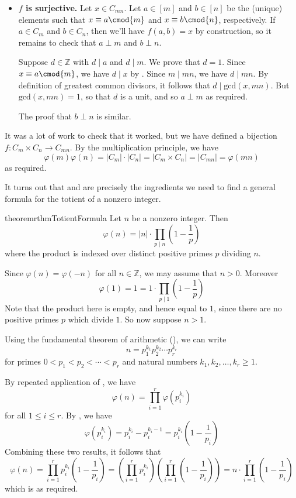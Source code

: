\begin{cproof}
\begin{itemize}
\item \textbf{$f$ is surjective.} Let $x \in C_{mn}$. Let $a \in [m]$ and $b \in [n]$ be the (unique) elements such that $x \equiv a \cmod{m}$ and $x \equiv b \cmod{n}$, respectively. If $a \in C_m$ and $b \in C_n$, then we'll have $f(a,b)=x$ by construction, so it remains to check that $a \perp m$ and $b \perp n$.

Suppose $d \in \mathbb{Z}$ with $d \mid a$ and $d \mid m$. We prove that $d=1$. Since $x \equiv a \cmod{m}$, we have $d \mid x$ by . Since $m \mid mn$, we have $d \mid mn$. By definition of greatest common divisors, it follows that $d \mid \mathrm{gcd}(x,mn)$. But $\mathrm{gcd}(x,mn)=1$, so that $d$ is a unit, and so $a \perp m$ as required.

The proof that $b \perp n$ is similar.
\end{itemize}
It was a lot of work to check that it worked, but we have defined a bijection $f : C_m \times C_n \to C_{mn}$. By the multiplication principle, we have
\[ \varphi(m) \varphi(n) = |C_m| \cdot |C_n| = |C_m \times C_n| = |C_{mn}| = \varphi(mn) \]
as required.
\end{cproof}

It turns out that  and  are precisely the ingredients we need to find a general formula for the totient of a nonzero integer.

\begin{restatable}{theorem}{rthmTotientFormula}
\label{thmTotientFormula}
Let $n$ be a nonzero integer. Then
\[ \varphi(n) = |n| \cdot \prod_{p \mid n} \left( 1 - \frac{1}{p} \right) \]
where the product is indexed over distinct positive primes $p$ dividing $n$.
\end{restatable}
\begin{cproof}
Since $\varphi(n) = \varphi(-n)$ for all $n \in \mathbb{Z}$, we may assume that $n>0$. Moreover
\[ \varphi(1) = 1 = 1 \cdot \prod_{p \mid 1} \left( 1 - \frac{1}{p} \right) \]
Note that the product here is empty, and hence equal to $1$, since there are no positive primes $p$ which divide $1$. So now suppose $n>1$.

Using the fundamental theorem of arithmetic (), we can write
\[ n = p_1^{k_1}p_2^{k_2} \cdots p_r^{k_r} \]
for primes $0<p_1<p_2<\cdots<p_r$ and natural numbers $k_1,k_2,\dots,k_r \ge 1$.

By repeated application of , we have
\[ \varphi(n) = \prod_{i=1}^r \varphi(p_i^{k_i}) \]
for all $1 \le i \le r$. By , we have
\[ \varphi(p_i^{k_i}) = p_i^{k_i}-p_i^{k_i-1} = p_i^{k_i} \left( 1-\frac{1}{p_i} \right) \]
Combining these two results, it follows that
\[ \varphi(n) = \prod_{i=1}^r p_i^{k_i} \left( 1 - \frac{1}{p_i} \right) = \left(\prod_{i=1}^r p_i^{k_i} \right) \left( \prod_{i=1}^r \left( 1 - \frac{1}{p_i} \right) \right) = n \cdot \prod_{i=1}^r \left( 1 - \frac{1}{p_i} \right) \]
which is as required.
\end{cproof}